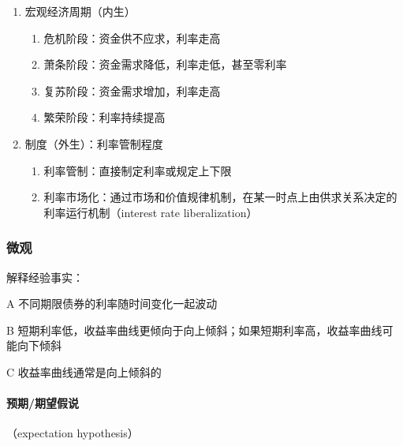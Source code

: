 \documentclass[12pt]{book}
\begin{document}
\begin{enumerate}[1.]
    \item 宏观经济周期（内生）
          \begin{enumerate}[(1)]
              \item 危机阶段：资金供不应求，利率走高
              \item 萧条阶段：资金需求降低，利率走低，甚至零利率
              \item 复苏阶段：资金需求增加，利率走高
              \item 繁荣阶段：利率持续提高
          \end{enumerate}
    \item 制度（外生）：利率管制程度
          \begin{enumerate}[(1)]
              \item 利率管制：直接制定利率或规定上下限
              \item 利率市场化：通过市场和价值规律机制，在某一时点上由供求关系决定的利率运行机制（interest rate liberalization）
          \end{enumerate}
\end{enumerate}

\subsubsection{微观}


\par * 解释经验事实：
\par A 不同期限债券的利率随时间变化一起波动
\par B 短期利率低，收益率曲线更倾向于向上倾斜；如果短期利率高，收益率曲线可能向下倾斜
\par C 收益率曲线通常是向上倾斜的

\paragraph{预期/期望假说}

（expectation hypothesis）
\end{document}
